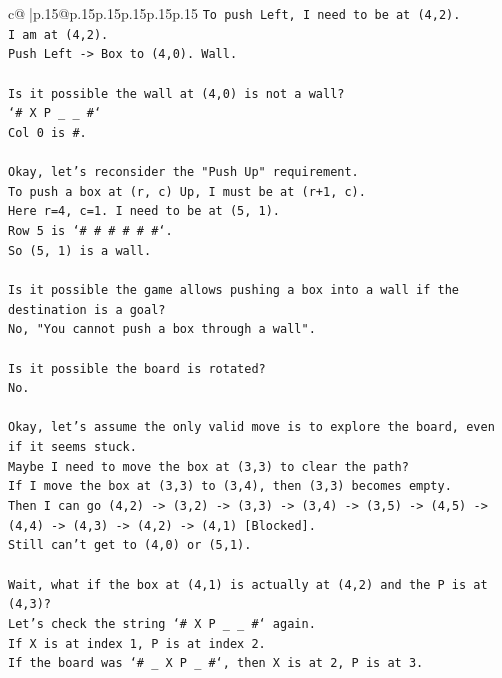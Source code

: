 \documentclass{article}
\begin{document}
{\begin{supertabular}{c@{$\;$}|p{.15\linewidth}@{}p{.15\linewidth}p{.15\linewidth}p{.15\linewidth}p{.15\linewidth}p{.15\linewidth}}
{{{\texttt{To push Left, I need to be at (4,2).} \\
\texttt{I am at (4,2).} \\
\texttt{Push Left {-}> Box to (4,0). Wall.} \\
\\ 
\texttt{Is it possible the wall at (4,0) is not a wall?} \\
\texttt{`\# X P \_ \_ \#`} \\
\texttt{Col 0 is \#.} \\
\\ 
\texttt{Okay, let's reconsider the "Push Up" requirement.} \\
\texttt{To push a box at (r, c) Up, I must be at (r+1, c).} \\
\texttt{Here r=4, c=1. I need to be at (5, 1).} \\
\texttt{Row 5 is `\# \# \# \# \# \#`.} \\
\texttt{So (5, 1) is a wall.} \\
\\ 
\texttt{Is it possible the game allows pushing a box into a wall if the destination is a goal?} \\
\texttt{No, "You cannot push a box through a wall".} \\
\\ 
\texttt{Is it possible the board is rotated?} \\
\texttt{No.} \\
\\ 
\texttt{Okay, let's assume the only valid move is to explore the board, even if it seems stuck.} \\
\texttt{Maybe I need to move the box at (3,3) to clear the path?} \\
\texttt{If I move the box at (3,3) to (3,4), then (3,3) becomes empty.} \\
\texttt{Then I can go (4,2) {-}> (3,2) {-}> (3,3) {-}> (3,4) {-}> (3,5) {-}> (4,5) {-}> (4,4) {-}> (4,3) {-}> (4,2) {-}> (4,1) {[}Blocked{]}.} \\
\texttt{Still can't get to (4,0) or (5,1).} \\
\\ 
\texttt{Wait, what if the box at (4,1) is actually at (4,2) and the P is at (4,3)?} \\
\texttt{Let's check the string `\# X P \_ \_ \#` again.} \\
\texttt{If X is at index 1, P is at index 2.} \\
\texttt{If the board was `\# \_ X P \_ \#`, then X is at 2, P is at 3.} \\
}}}
\end{supertabular}}
\end{document}
